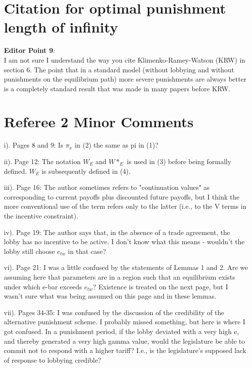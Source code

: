\documentclass[12pt]{article}
\begin{document}
\section{Citation for optimal punishment length of infinity}
\textbf{Editor Point 9}:\\
I am not sure I understand the way you cite Klimenko-Ramey-Watson (KRW) in section 6. The point that in a standard model (without lobbying and without punishments on the equilibrium path) more severe punishments are always better is a completely standard result that was made in many papers before KRW.


\section{Referee 2 Minor Comments}
i).  Pages 8 and 9: Is $\pi_x$ in (2) the same as pi in (1)?

ii). Page 12: The notation $W_E$ and $W*_E$ is used in (3) before being formally defined. $W_E$ is subsequently defined in (4).

iii). Page 16: The author sometimes refers to "continuation values" as corresponding to current payoffs plus discounted future payoffs, but I think the more conventional use of the term refers only to the latter (i.e., to the V terms in the incentive constraint).

iv). Page 19: The author says that, in the absence of a trade agreement, the lobby has no incentive to be active. I don't know what this means - wouldn't the lobby still choose $e_{tw}$ in that case?

vi). Page 21: I was a little confused by the statements of Lemmas 1 and 2. Are we assuming here that parameters are in a region such that an equilibrium exists under which e-bar exceeds $e_{tw}$? Existence is treated on the next page, but I wasn't sure what was being assumed on this page and in these lemmas.

vii). Pages 34-35: I was confused by the discussion of the credibility of the alternative punishment scheme. I probably missed something, but here is where I got confused. In a punishment period, if the lobby deviated with a very high e, and thereby generated a very high gamma value, would the legislature be able to commit not to respond with a higher tariff? I.e., is the legislature's supposed lack of response to lobbying credible?

\newpage
\end{document}
